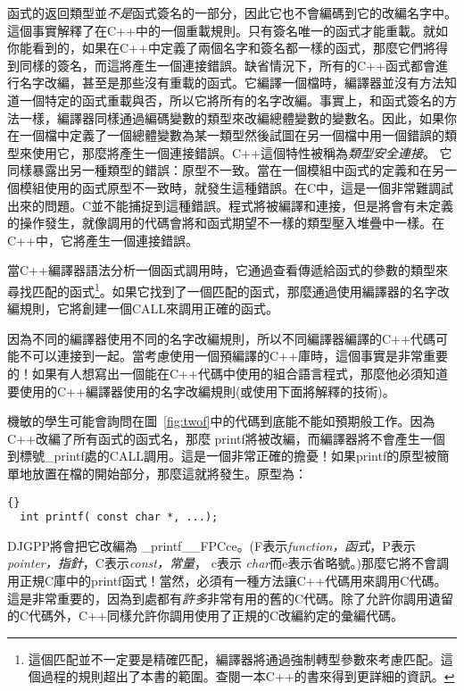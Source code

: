 函式的返回類型並\emph{不是}函式簽名的一部分，因此它也不會編碼到它的改編名字中。這個事實解釋了在C++中的一個重載規則。只有簽名唯一的函式才能重載。就如你能看到的，如果在C++中定義了兩個名字和簽名都一樣的函式，那麼它們將得到同樣的簽名，而這將產生一個連接錯誤。缺省情況下，所有的C++函式都會進行名字改編，甚至是那些沒有重載的函式。它編譯一個檔時，編譯器並沒有方法知道一個特定的函式重載與否，所以它將所有的名字改編。事實上，和函式簽名的方法一樣，編譯器同樣通過編碼變數的類型來改編總體變數的變數名。因此，如果你在一個檔中定義了一個總體變數為某一類型然後試圖在另一個檔中用一個錯誤的類型來使用它，那麼將產生一個連接錯誤。C++這個特性被稱為\emph{類型安全連接}。
它同樣暴露出另一種類型的錯誤：原型不一致。當在一個模組中函式的定義和在另一個模組使用的函式原型不一致時，就發生這種錯誤。在C中，這是一個非常難調試出來的問題。C並不能捕捉到這種錯誤。程式將被編譯和連接，但是將會有未定義的操作發生，就像調用的代碼會將和函式期望不一樣的類型壓入堆疊中一樣。在C++中，它將產生一個連接錯誤。

當C++編譯器語法分析一個函式調用時，它通過查看傳遞給函式的參數的類型來尋找匹配的函式\footnote{這個匹配並不一定要是精確匹配，編譯器將通過強制轉型參數來考慮匹配。這個過程的規則超出了本書的範圍。查閱一本C++的書來得到更詳細的資訊。}。如果它找到了一個匹配的函式，那麼通過使用編譯器的名字改編規則，它將創建一個{\code CALL}來調用正確的函式。

因為不同的編譯器使用不同的名字改編規則，所以不同編譯器編譯的C++代碼可能不可以連接到一起。當考慮使用一個預編譯的C++庫時，這個事實是非常重要的！如果有人想寫出一個能在C++代碼中使用的組合語言程式，那麼他必須知道要使用的C++編譯器使用的名字改編規則(或使用下面將解釋的技術)。

機敏的學生可能會詢問在圖~\ref{fig:twof}中的代碼到底能不能如預期般工作。因為C++改編了所有函式的函式名，那麼
{\code printf}將被改編，而編譯器將不會產生一個到標號{\code \_printf}處的{\code CALL}調用。這是一個非常正確的擔憂！如果{\code printf}的原型被簡單地放置在檔的開始部分，那麼這就將發生。原型為：
\begin{lstlisting}[stepnumber=0]{}
  int printf( const char *, ...);
\end{lstlisting}
\noindent DJGPP將會把它改編為{\code
\_printf\_\_FPCce}。({\code F}表示\emph{function，函式}，{\code P}表示\\\emph{pointer，指針}，{\code C}表示\emph{const，常量}， {\code c}表示
\emph{char}而{\code e}表示省略號。)那麼它將不會調用正規C庫中的{\code printf}函式！當然，必須有一種方法讓C++代碼用來調用C代碼。這是非常重要的，因為到處都有\emph{許多}非常有用的舊的C代碼。除了允許你調用遺留的C代碼外，C++同樣允許你調用使用了正規的C改編約定的彙編代碼。

